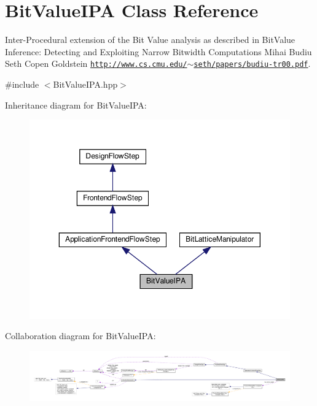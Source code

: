\hypertarget{classBitValueIPA}{}\section{Bit\+Value\+I\+PA Class Reference}
\label{classBitValueIPA}


Inter-\/\+Procedural extension of the Bit Value analysis as described in Bit\+Value Inference\+: Detecting and Exploiting Narrow Bitwidth Computations Mihai Budiu Seth Copen Goldstein \href{http://www.cs.cmu.edu/~seth/papers/budiu-tr00.pdf}{\tt http\+://www.\+cs.\+cmu.\+edu/$\sim$seth/papers/budiu-\/tr00.\+pdf}.  




{\ttfamily \#include $<$Bit\+Value\+I\+P\+A.\+hpp$>$}



Inheritance diagram for Bit\+Value\+I\+PA\+:
\nopagebreak
\begin{figure}[H]
\begin{center}
\leavevmode
\includegraphics[width=350pt]{dd/dd7/classBitValueIPA__inherit__graph}
\end{center}
\end{figure}


Collaboration diagram for Bit\+Value\+I\+PA\+:
\nopagebreak
\begin{figure}[H]
\begin{center}
\leavevmode
\includegraphics[width=350pt]{d2/d2d/classBitValueIPA__coll__graph}
\end{center}
\end{figure}
